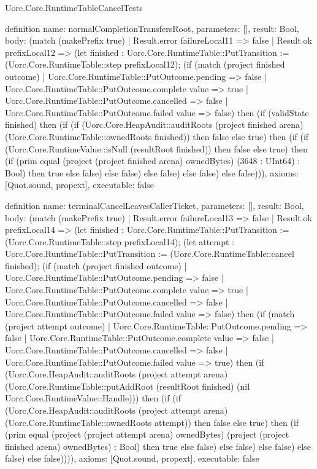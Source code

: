 \begin{lexlean}{Uorc.Core.RuntimeTableCancelTests}
\begin{semanticmodule}
definition{
  name: normalCompletionTransfersRoot,
  parameters: [],
  result: Bool,
  body: (match (makePrefix true)
    | Result.error failureLocal11 => false
    | Result.ok prefixLocal12 => (let finished : Uorc.Core.RuntimeTable::PutTransition := (Uorc.Core.RuntimeTable::step prefixLocal12); (if (match (project finished outcome)
      | Uorc.Core.RuntimeTable::PutOutcome.pending => false
      | Uorc.Core.RuntimeTable::PutOutcome.complete value => true
      | Uorc.Core.RuntimeTable::PutOutcome.cancelled => false
      | Uorc.Core.RuntimeTable::PutOutcome.failed value => false) then (if (validState finished) then (if (if (Uorc.Core.HeapAudit::auditRoots (project finished arena) (Uorc.Core.RuntimeTable::ownedRoots finished)) then false else true) then (if (if (Uorc.Core.RuntimeValue::isNull (resultRoot finished)) then false else true) then (if (prim equal (project (project finished arena) ownedBytes) (3648 : UInt64) : Bool) then true else false) else false) else false) else false) else false))),
  axioms: [Quot.sound, propext],
  executable: false
}

definition{
  name: terminalCancelLeavesCallerTicket,
  parameters: [],
  result: Bool,
  body: (match (makePrefix true)
    | Result.error failureLocal13 => false
    | Result.ok prefixLocal14 => (let finished : Uorc.Core.RuntimeTable::PutTransition := (Uorc.Core.RuntimeTable::step prefixLocal14); (let attempt : Uorc.Core.RuntimeTable::PutTransition := (Uorc.Core.RuntimeTable::cancel finished); (if (match (project finished outcome)
      | Uorc.Core.RuntimeTable::PutOutcome.pending => false
      | Uorc.Core.RuntimeTable::PutOutcome.complete value => true
      | Uorc.Core.RuntimeTable::PutOutcome.cancelled => false
      | Uorc.Core.RuntimeTable::PutOutcome.failed value => false) then (if (match (project attempt outcome)
      | Uorc.Core.RuntimeTable::PutOutcome.pending => false
      | Uorc.Core.RuntimeTable::PutOutcome.complete value => false
      | Uorc.Core.RuntimeTable::PutOutcome.cancelled => false
      | Uorc.Core.RuntimeTable::PutOutcome.failed value => true) then (if (Uorc.Core.HeapAudit::auditRoots (project attempt arena) (Uorc.Core.RuntimeTable::putAddRoot (resultRoot finished) (nil Uorc.Core.RuntimeValue::Handle))) then (if (if (Uorc.Core.HeapAudit::auditRoots (project attempt arena) (Uorc.Core.RuntimeTable::ownedRoots attempt)) then false else true) then (if (prim equal (project (project attempt arena) ownedBytes) (project (project finished arena) ownedBytes) : Bool) then true else false) else false) else false) else false) else false)))),
  axioms: [Quot.sound, propext],
  executable: false
}


\end{semanticmodule}
\end{lexlean}
